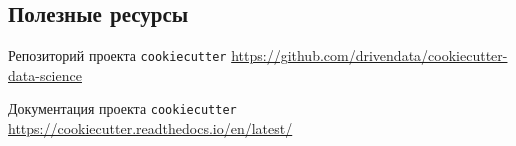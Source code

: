 \documentclass[%
	11pt,
	a4paper,
	utf8,
		]{article}
\begin{document}
\subsection{Полезные ресурсы}

Репозиторий проекта \texttt{cookiecutter} \url{https://github.com/drivendata/cookiecutter-data-science}

Документация проекта \texttt{cookiecutter} \url{https://cookiecutter.readthedocs.io/en/latest/}




\end{document}
